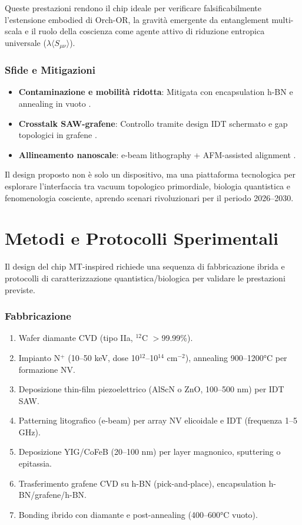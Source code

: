 \documentclass[12pt,a4paper]{article}
\begin{document}
Queste prestazioni rendono il chip ideale per verificare falsificabilmente l'estensione embodied di Orch-OR, la gravità emergente da entanglement multi-scala e il ruolo della coscienza come agente attivo di riduzione entropica universale ($\lambda \langle S_{\mu\nu} \rangle$).

\subsubsection{Sfide e Mitigazioni}

\begin{itemize}
    \item \textbf{Contaminazione e mobilità ridotta}: Mitigata con encapsulation h-BN e annealing in vuoto \cite{Geim2012}.
    \item \textbf{Crosstalk SAW-grafene}: Controllo tramite design IDT schermato e gap topologici in grafene \cite{Ku2019}.
    \item \textbf{Allineamento nanoscale}: e-beam lithography + AFM-assisted alignment \cite{Lee2018}.
\end{itemize}

Il design proposto non è solo un dispositivo, ma una piattaforma tecnologica per esplorare l'interfaccia tra vacuum topologico primordiale, biologia quantistica e fenomenologia cosciente, aprendo scenari rivoluzionari per il periodo 2026--2030.




\section{Metodi e Protocolli Sperimentali}

Il design del chip MT-inspired richiede una sequenza di fabbricazione ibrida e protocolli di caratterizzazione quantistica/biologica per validare le prestazioni previste.

\subsubsection{Fabbricazione}

\begin{enumerate}
    \item Wafer diamante CVD (tipo IIa, $^{12}$C $>$99.99\%).
    \item Impianto N$^+$ (10--50 keV, dose 10$^{12}$--10$^{14}$ cm$^{-2}$), annealing 900--1200°C per formazione NV.
    \item Deposizione thin-film piezoelettrico (AlScN o ZnO, 100--500 nm) per IDT SAW.
    \item Patterning litografico (e-beam) per array NV elicoidale e IDT (frequenza 1--5 GHz).
    \item Deposizione YIG/CoFeB (20--100 nm) per layer magnonico, sputtering o epitassia.
    \item Trasferimento grafene CVD su h-BN (pick-and-place), encapsulation h-BN/grafene/h-BN.
    \item Bonding ibrido con diamante e post-annealing (400--600°C vuoto).
\end{enumerate}
\end{document}
